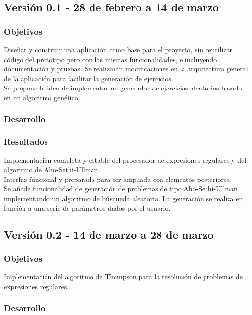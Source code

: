 \subsection{Versión 0.1 - 28 de febrero a 14 de marzo}

\subsubsection{Objetivos}
Diseñar y construir una aplicación como base para el proyecto, sin reutilizar código del prototipo pero con las mismas funcionalidades, e incluyendo documentación y pruebas.
Se realizarán modificaciones en la arquitectura general de la aplicación para facilitar la generación de ejercicios.
\\
Se propone la idea de implementar un generador de ejercicios aleatorios basado en un algoritmo genético.

\subsubsection{Desarrollo}

\subsubsection{Resultados}
Implementación completa y estable del procesador de expresiones regulares y del algoritmo de Aho-Sethi-Ullman.
\\
Interfaz funcional y preparada para ser ampliada con elementos posteriores.
\\
Se añade funcionalidad de generación de problemas de tipo Aho-Sethi-Ullman implementando un algoritmo de búsqueda aleatoria.
La generación se realiza en función a una serie de parámetros dados por el usuario.

\subsection{Versión 0.2 - 14 de marzo a 28 de marzo}

\subsubsection{Objetivos}
Implementación del algoritmo de Thompson para la resolución de problemas de expresiones regulares.

\subsubsection{Desarrollo}

